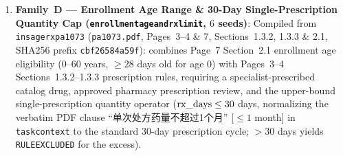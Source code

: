 \documentclass[10pt,twocolumn]{article}
\renewcommand{\_}{\textunderscore\allowbreak}
\begin{document}
\begin{enumerate}[leftmargin=*,nosep]
  \item \textbf{Family~D --- Enrollment Age Range \& 30-Day Single-Prescription Quantity Cap (\texttt{enrollment\_age\_and\_rx\_limit}, $6$ seeds)}: Compiled from \texttt{ins\_age\_rx\_pa1073} (\texttt{pa\_1073.pdf}, Pages~3--4 \& 7, Sections~1.3.2, 1.3.3 \& 2.1, SHA256 prefix \texttt{cbf26584a59f}): combines Page~7 Section~2.1 enrollment age eligibility ($0\text{--}60$ years, $\ge 28$ days old for age $0$) with Pages~3--4 Sections~1.3.2--1.3.3 prescription rules, requiring a specialist-prescribed catalog drug, approved pharmacy prescription review, and the upper-bound single-prescription quantity operator ($\text{rx\_days} \le 30$ days, normalizing the verbatim PDF clause ``单次处方药量不超过1个月'' [$\le 1$ month] in \texttt{task\_context} to the standard 30-day prescription cycle; $> 30$ days yields \texttt{RULE\_EXCLUDED} for the excess).
\end{enumerate}
\end{document}
